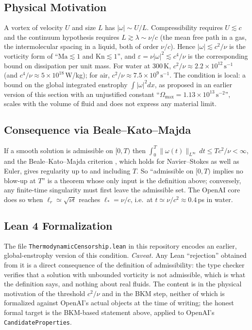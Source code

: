 \documentclass[11pt,a4paper]{article}
\theoremstyle{definition}
\begin{document}
\subsection{Physical Motivation}
A vortex of velocity $U$ and size $L$ has $|\omega|\sim U/L$. Compressibility requires $U\lesssim c$ and the continuum hypothesis requires $L\gtrsim\lambda\sim\nu/c$ (the mean free path in a gas, the intermolecular spacing in a liquid, both of order $\nu/c$). Hence $|\omega|\lesssim c^2/\nu$ is the vorticity form of ``$\mathrm{Ma}\lesssim1$ and $\mathrm{Kn}\lesssim1$'', and $\varepsilon=\nu|\omega|^2\lesssim c^4/\nu$ is the corresponding bound on dissipation per unit mass. For water at 300\,K, $c^2/\nu\approx2.2\times10^{12}\,\mathrm{s^{-1}}$ (and $c^4/\nu\approx5\times10^{18}$\,W/kg); for air, $c^2/\nu\approx7.5\times10^{9}\,\mathrm{s^{-1}}$. The condition is local: a bound on the global integrated enstrophy $\int|\omega|^2dx$, as proposed in an earlier version of this section with an unjustified constant ``$\Omega_{\max}=1.13\times10^{13}\,\mathrm{s^{-2}}$'', scales with the volume of fluid and does not express any material limit.

\subsection{Consequence via Beale--Kato--Majda}
If a smooth solution is admissible on $[0,T)$ then $\int_0^T\|\omega(t)\|_{L^\infty}\,dt\le T c^2/\nu<\infty$, and the Beale--Kato--Majda criterion \cite{BKM1984}, which holds for Navier--Stokes as well as Euler, gives regularity up to and including $T$. So ``admissible on $[0,T)$ implies no blow-up at $T$'' is a theorem whose only input is the definition above; conversely, any finite-time singularity must first leave the admissible set. The OpenAI core does so when $\ell_r\simeq\sqrt{\nu t}$ reaches $\ell_*=\nu/c$, i.e.\ at $t\simeq\nu/c^2\approx0.4$\,ps in water.

\subsection{Lean 4 Formalization}
The file \texttt{ThermodynamicCensorship.lean} in this repository encodes an earlier, global-enstrophy version of this condition. \emph{Caveat.} Any Lean ``rejection'' obtained from it is a direct consequence of the definition of admissibility: the type checker verifies that a solution with unbounded vorticity is not admissible, which is what the definition says, and nothing about real fluids. The content is in the physical motivation of the threshold $c^2/\nu$ and in the BKM step, neither of which is formalized against OpenAI's actual objects at the time of writing; the honest formal target is the BKM-based statement above, applied to OpenAI's \texttt{CandidateProperties}.
\end{document}
